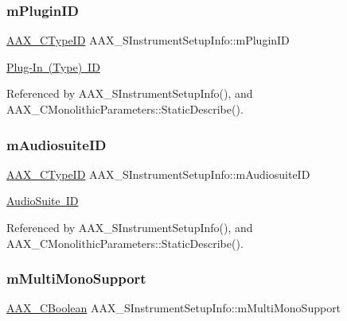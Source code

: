 \subsubsection{\texorpdfstring{mPluginID}{mPluginID}}
{\footnotesize\ttfamily \mbox{\hyperlink{a00392_ac678f9c1fbcc26315d209f71a147a175}{A\+A\+X\+\_\+\+C\+Type\+ID}} A\+A\+X\+\_\+\+S\+Instrument\+Setup\+Info\+::m\+Plugin\+ID}



\mbox{\hyperlink{a00662_a13e384f22825afd3db6d68395b79ce0da89ca3dd6e96895cda14976c1b1ceb826}{Plug-\/\+In (Type) ID}} 



Referenced by A\+A\+X\+\_\+\+S\+Instrument\+Setup\+Info(), and A\+A\+X\+\_\+\+C\+Monolithic\+Parameters\+::\+Static\+Describe().

\mbox{\label{a01957_a9feeadf3348cf1b4ce13008d3a02aaef}} 
\subsubsection{\texorpdfstring{mAudiosuiteID}{mAudiosuiteID}}
{\footnotesize\ttfamily \mbox{\hyperlink{a00392_ac678f9c1fbcc26315d209f71a147a175}{A\+A\+X\+\_\+\+C\+Type\+ID}} A\+A\+X\+\_\+\+S\+Instrument\+Setup\+Info\+::m\+Audiosuite\+ID}



\mbox{\hyperlink{a00662_a13e384f22825afd3db6d68395b79ce0dad3344696b8298a8b254add3d039ea927}{Audio\+Suite ID}} 



Referenced by A\+A\+X\+\_\+\+S\+Instrument\+Setup\+Info(), and A\+A\+X\+\_\+\+C\+Monolithic\+Parameters\+::\+Static\+Describe().

\mbox{\label{a01957_a0803c641f72241bea5d7cf984c6263ca}} 
\subsubsection{\texorpdfstring{mMultiMonoSupport}{mMultiMonoSupport}}
{\footnotesize\ttfamily \mbox{\hyperlink{a00392_aa216506530f1d19a2965931ced2b274b}{A\+A\+X\+\_\+\+C\+Boolean}} A\+A\+X\+\_\+\+S\+Instrument\+Setup\+Info\+::m\+Multi\+Mono\+Support}

